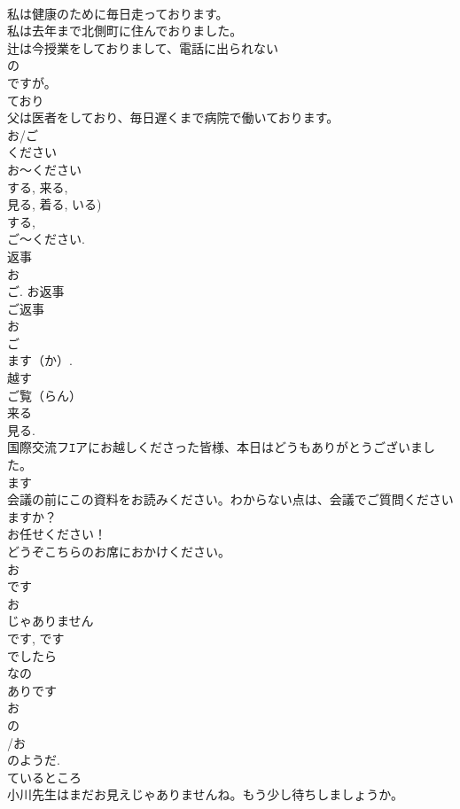 \documentclass[8pt]{extreport}
\begin{document}
\begin{CJK}{UTF8}{min}
\\	私は健康のために毎日走っております。
\\	私は去年まで北側町に住んでおりました。
\\	辻は今授業をしておりまして、電話に出られない
\\	の
\\	ですが。
\\	ており 
\\	父は医者をしており、毎日遅くまで病院で働いております。
\\	お/ご
\\	ください
\\	お～ください 
\\	する, 来る, 
\\	見る, 着る, いる)
\\	する, 
\\	ご～ください.
\\	返事 
\\	お 
\\	ご. お返事 
\\	ご返事 
\\	お 
\\	ご 
\\	ます（か）. 
\\	越す 
\\	ご覧（らん） 
\\	来る 
\\	見る.
\\	国際交流フｴアにお越しくださった皆様、本日はどうもありがとうございました。
\\	ます 
\\	会議の前にこの資料をお読みください。わからない点は、会議でご質問くださいますか？
\\	お任せください！
\\	どうぞこちらのお席におかけください。
\\	お
\\	です
\\	お
\\	じゃありません
\\	です, です 
\\	でしたら 
\\	なの 
\\	ありです 
\\	お
\\	の
\\	/お
\\	のようだ.
\\	ているところ 
\\	小川先生はまだお見えじゃありませんね。もう少し待ちしましょうか。

\end{CJK}
\end{document}
